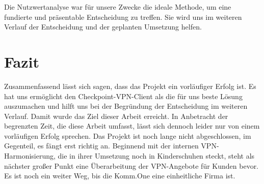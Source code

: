 Die Nutzwertanalyse war für unsere Zwecke die ideale Methode, um eine fundierte und präsentable Entscheidung zu treffen. Sie wird uns im weiteren Verlauf der Entscheidung und der geplanten Umsetzung helfen.


\section{Fazit} %
\label{sec:Fazit}

Zusammenfassend lässt sich sagen, dass das Projekt ein vorläufiger Erfolg ist. Es hat uns ermöglicht den Checkpoint-VPN-Client als die für uns beste Lösung auszumachen und hilft uns bei der Begründung der Entscheidung im weiteren Verlauf. Damit wurde das Ziel dieser Arbeit erreicht. In Anbetracht der begrenzten Zeit, die diese Arbeit umfasst, lässt sich dennoch leider nur von einem vorläufigen Erfolg sprechen. Das Projekt ist noch lange nicht abgeschlossen, im Gegenteil, es fängt erst richtig an. Beginnend mit der internen VPN-Harmonisierung, die in ihrer Umsetzung noch in Kinderschuhen steckt, steht als nächster großer Punkt eine Überarbeitung der VPN-Angebote für Kunden bevor. Es ist noch ein weiter Weg, bis die Komm.One eine einheitliche Firma ist.


